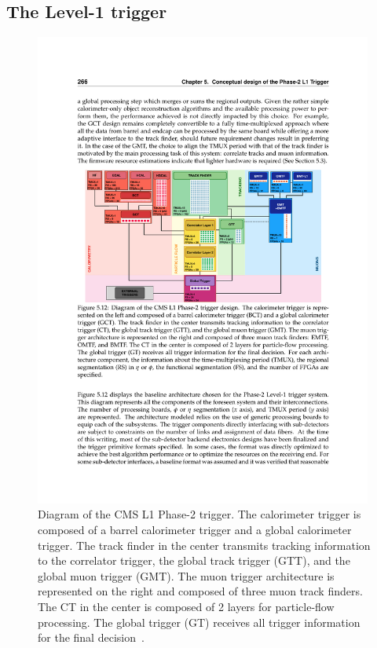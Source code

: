 \documentclass[12pt]{iopart}
\begin{document}
\subsection{The Level-1 trigger}
\begin{figure}[ht]
    \centering
    \includegraphics[width=0.99\textwidth]{figures/phase2l1.pdf}
    \caption{Diagram of the CMS L1 Phase-2 trigger. The calorimeter trigger is composed of a barrel calorimeter trigger and a global calorimeter trigger. The track finder in the center transmits tracking information to the correlator trigger, the global track trigger (GTT), and the global muon trigger (GMT). The muon trigger architecture is represented on the right and composed of three muon track finders. The CT in the center is composed of 2 layers for particle-flow processing. The global trigger (GT) receives all trigger information for the final decision~\cite{tdr}.}
    \label{fig:phase2}
\end{figure}
\end{document}
